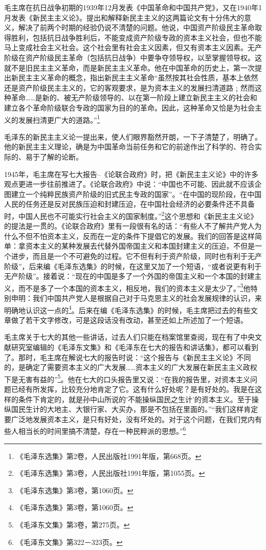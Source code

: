 \documentclass[UTF8, 12pt, a4paper]{ctexrep}
\begin{document}
毛主席在抗日战争初期的1939年12月发表《中国革命和中国共产党》，又在1940年1月发表《新民主主义论》。提出和解释新民主主义的这两篇论文有十分伟大的意义，解决了前两个时期的经验仍说不清楚的问题。他说，中国资产阶级民主革命取得胜利，包括抗日战争胜利后，不能变成资产阶级专政的资本主义社会，但也不能马上变成社会主义社会。这个社会里有社会主义因素，但又有资本主义因素。无产阶级在资产阶级民主革命（包括抗日战争）中要争夺领导权，以至掌握领导权。这就不是旧民主主义革命，而是新民主主义革命。他在中国革命的历史上，第一次提出新民主主义革命的概念，指出新民主主义革命“虽然按其社会性质，基本上依然还是资产阶级民主主义的，它的客观要求，是为资本主义的发展扫清道路﹔然而这种革命……是新的、被无产阶级领导的、以在第一阶段上建立新民主主义的社会和建立各个革命阶级联合专政的国家为目的的革命。因此，这种革命又恰是为社会主义的发展扫清更广大的道路。”\footnote{《毛泽东选集》第2卷，人民出版社1991年版，第668页。}

毛泽东的新民主主义论一提出来，使人们眼界豁然开朗，一下子清楚了，明确了。他的新民主主义理论，确是为中国革命当前任务和它的前途作出了科学的、符合实际的、易于了解的论断。

1945年，毛主席在写七大报告--《论联合政府》时，把《新民主主义论》中的许多观点更进一步往前推进了。《论联合政府》中说：“中国也不可能、因此就不应该企图建立一个纯粹民族资产阶级的旧式民主专政的国家”。“在中国的现阶段，在中国人民的任务还是反对民族压迫和封建压迫，在中国社会经济的必要条件还不具备时，中国人民也不可能实行社会主义的国家制度。”\footnote{《毛泽东选集》第3卷，人民出版社1991年版，第1055页。}这个思想和《新民主主义论》的提法是一贯的。《论联合政府》里有一段很有名的话：“有些人不了解共产党人为什么不但不怕资本主义，反而在一定的条件下提倡它的发展。我们的回答是这样简单：拿资本主义的某种发展去代替外国帝国主义和本国封建主义的压迫，不但是一个进步，而且是一个不可避免的过程。它不但有利于资产阶级，同时也有利于无产阶级”，后来编《毛泽东选集》的时候，在这里又加了一个短语，“或者说更有利于无产阶级”。接着说：“现在的中国是多了一个外国的帝国主义和一个本国的封建主义，而不是多了一个本国的资本主义，相反地，我们的资本主义是太少了。”\footnote{《毛泽东选集》第3卷，第1060页。}他特别申明：我们中国共产党人是根据自己对于马克思主义的社会发展规律的认识，来明确地认识这一点的\footnote{《毛泽东选集》第3卷，第1060页。}。后来在编《毛泽东选集》的时候，毛主席把过去的有些文章做了若干文字修改，可是这段话没有改动，甚至还如上所述加了一个短语。

毛主席关于七大的其他一些讲话，过去人们只能在档案馆里查阅，现在有了中央文献研究室编辑的《毛泽东文集》和《毛泽东在七大的报告和讲话集》，都可以看到了。那时，毛主席在解说七大的报告时说：“这个报告与《新民主主义论》不同的，是确定了需要资本主义的广大发展……资本主义的广大发展在新民主主义政权下是无害有益的”\footnote{《毛泽东文集》第3卷，第275页。}。他在七大的口头报告里又说：“在我的报告里，对资本主义问题已经有所发挥，比较充分地肯定了它。这有什么好处呢？是有好处的。我是在这样的条件下肯定的，就是孙中山所说的'不能操纵国民之生计'的资本主义。至于操纵国民生计的大地主、大银行家、大买办，那是不包括在里面的。”“我们这样肯定要广泛地发展资本主义，是只有好处，没有坏处的。对于这个问题，在我们党内有些人相当长的时间里搞不清楚，存在一种民粹派的思想。”\footnote{《毛泽东文集》第322－323页。}
\end{document}
